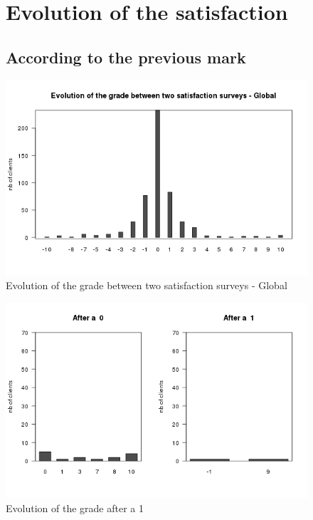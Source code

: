 \documentclass[a4paper, 11pt]{article}
\begin{document}
\clearpage

	\begin{figure}[!ht]
			\section{Evolution of the satisfaction}
			\label{app:evolution}
				\subsection{According to the previous mark}
			
                \centering
                \includegraphics[height = 10 cm]{Remi/Evolution_of_the_grade_between_two_satisfaction_surveys_-_Global.png}
                \caption{Evolution of the grade between two satisfaction surveys - Global}
                \label{fig:e_Global}
        \end{figure}

        \begin{figure}[!ht]
                \centering
                \includegraphics[height = 10 cm]{Remi/Evolution_of_the_grade_after_a_1.png}
                \caption{Evolution of the grade after a 1}
                \label{fig:e_1}
        \end{figure}
\end{document}
